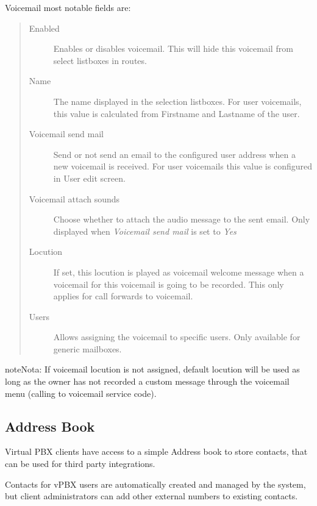 \documentclass[letterpaper,10pt,spanish]{sphinxmanual}
\begin{document}
Voicemail most notable fields are:
\begin{quote}
\begin{description}
\item[{Enabled}] \leavevmode
Enables or disables voicemail. This will hide this voicemail from select listboxes in routes.

\item[{Name}] \leavevmode
The name displayed in the selection listboxes. For user voicemails, this value is calculated from Firstname and
Lastname of the user.

\item[{Voicemail send mail}] \leavevmode
Send or not send an email to the configured user address when a new voicemail is received. For user voicemails this value
is configured in User edit screen.

\item[{Voicemail attach sounds}] \leavevmode
Choose whether to attach the audio message to the sent email. Only displayed when \emph{Voicemail send mail} is set to \emph{Yes}

\item[{Locution}] \leavevmode
If set, this locution is played as voicemail welcome message when a voicemail
for this voicemail is going to be recorded. This only applies for call forwards
to voicemail.

\item[{Users}] \leavevmode
Allows assigning the voicemail to specific users. Only available for generic mailboxes.

\end{description}
\end{quote}

\begin{notice}{note}{Nota:}
If voicemail locution is not assigned, default locution will be used as long as
the owner has not recorded a custom message through the voicemail menu (calling to
voicemail service code).
\end{notice}


\subsection{Address Book}
\label{administration_portal/client/vpbx/addressbook:address-book}\label{administration_portal/client/vpbx/addressbook::doc}
Virtual PBX clients have access to a simple Address book to store contacts,
that can be used for third party integrations.

Contacts for vPBX users are automatically created and managed by the system,
but client administrators can add other external numbers to existing contacts.
\end{document}
